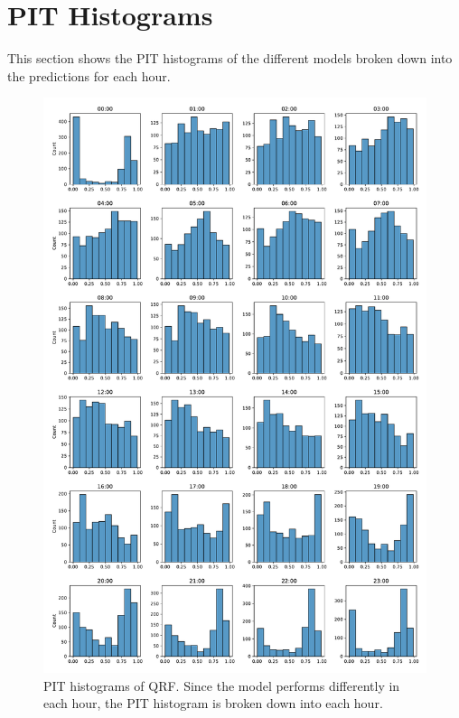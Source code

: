 \section{PIT Histograms}

This section shows the PIT histograms of the different models 
broken down into the predictions for each hour.

\begin{figure}[h]%
    \centering
    \includegraphics[width=\textwidth]{plots/pit/pit_by_hour_qrf.pdf}
    \caption[PIT histograms QRF]{PIT histograms of QRF. Since the model performs differently 
    in each hour, the PIT histogram is broken down into each hour.}%
    \label{fig:pit-qrf-by-hour}%
\end{figure}

